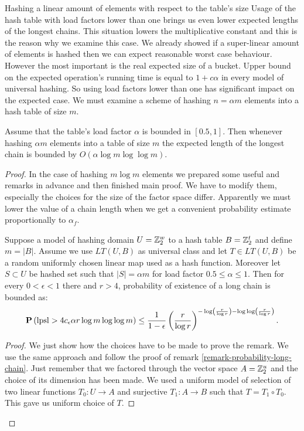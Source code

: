 \begin{section}{Hashing a linear amount of elements with respect to the table's size}
Usage of the hash table with load factors lower than one brings us even lower expected lengths of the longest chains. This situation lowers the multiplicative constant and this is the reason why we examine this case. We already showed if a super-linear amount of elements is hashed then we can expect reasonable worst case behaviour. However the most important is the real expected size of a bucket. Upper bound on the expected operation's running time is equal to $1 + c \alpha$ in every model of universal hashing. So using load factors lower than one has significant impact on the expected case. We must examine a scheme of hashing $n = \alpha m$ elements into a hash table of size $m$. 

\begin{theorem}
\label{theorem-n-to-n}
Assume that the table's load factor $\alpha$ is bounded in $\left[0.5, 1\right]$. Then whenever hashing $\alpha m$ elements into a table of size $m$ the expected length of the longest chain is bounded by $O(\alpha \log m \log \log m)$.
\end{theorem}
\begin{proof}

In the case of hashing $m \log m$ elements we prepared some useful and remarks in advance and then finished main proof. We have to modify them, especially the choices for the size of the factor space differ. Apparently we must lower the value of a chain length when we get a convenient probability estimate proportionally to $\alpha_f$. 

\begin{remark}
Suppose a model of hashing domain $U = \mathbb{Z}_{2}^{w}$ to a hash table $B = \mathbb{Z}_{2}^{t}$ and define $m = |B|$. Assume we use $LT(U, B)$ as universal class and let $T \in LT(U, B)$ be a random uniformly chosen linear map used as a hash function. Moreover let $S \subset U$ be hashed set such that $|S| = \alpha m$ for load factor $0.5 \leq \alpha \leq 1$. Then for every $0 < \epsilon < 1$ there and $r > 4$,  probability of existence of a long chain is bounded as:
\[
\mathbf{P}\left(\mathrm{lpsl} > 4 c_\epsilon \alpha r \log m \log \log m\right) \leq \frac{1}{1 - \epsilon} \left(\frac{r}{\log r}\right)^{-\log \left(\frac{r}{\log r}\right) - \log \log \left(\frac{r}{\log r}\right)} \text{.}
\]
\end{remark}
\begin{proof}
We just show how the choices have to be made to prove the remark. We use the same approach and follow the proof of remark \ref{remark-probability-long-chain}. Just remember that we factored through the vector space $A = \mathbb{Z}_{2}^{u}$ and the choice of its dimension has been made. We used a uniform model of selection of two linear functions $T_0: U \rightarrow A$ and surjective $T_1: A \rightarrow B$ such that $T = T_1 \circ T_0$. This gave us uniform choice of $T$.


\end{proof}
\end{proof}
\end{section}
